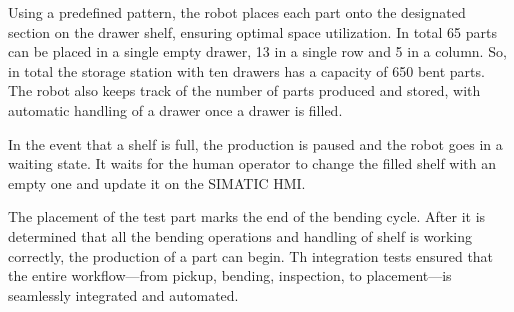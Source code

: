 Using a predefined pattern, the robot places each part onto the designated section on the drawer shelf, ensuring optimal space utilization. In total 65 parts can be placed in a single empty drawer, 13 in a single row and 5 in a column. So, in total the storage station with ten drawers has a capacity of 650 bent parts. The robot also keeps track of the number of parts produced and stored, with automatic handling of a drawer once a drawer is filled.

In the event that a shelf is full, the production is paused and the robot goes in a waiting state. It waits for the human operator to change the filled shelf with an empty one and update it on the SIMATIC HMI.

The placement of the test part marks the end of the bending cycle. After it is determined that all the bending operations and handling of shelf is working correctly, the production of a part can begin.
Th integration tests ensured that the entire workflow—from pickup, bending, inspection, to placement—is seamlessly integrated and automated.



